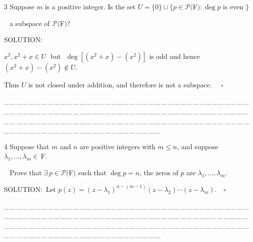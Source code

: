 \documentclass[a4paper, 11pt, UTF8]{article}
\def\Po{\mathcal{P}}
\def\Fbfc{$\,{\timesbf F}$}
\begin{document}
\begin{large}
{\timesbf\Large 3} {\timessl\Large 
Suppose $m$ is a positive integer. Is the set $U=\{0\}\cup\{p\in\Po(${\timesbf F}$):\deg p$ is even $\}$
}\par\,\,\,
{\timessl\Large a subspace of $\Po(${\timesbf F}$)$?
}\par
{\timesbf S\footnotesize{OLUTION:}}\par\quad
$x^2,x^2+x\in U$ \,\,but\,\, $\deg[(x^2+x)-(x^2)]$ is odd and hence $(x^2+x)-(x^2)\not\in U.$\par\quad
Thus $U$ is not closed under addition, and therefore is not a subspace. $\quad\square$\par
{\tiny \_\,\_\,\_\,\_\,\_\,\_\,\_\,\_\,\_\,\_\,\_\,\_\,\_\,\_\,\_\,\_\,\_\,\_\,\_\,\_\,\_\,\_\,\_\,\_\,\_\,\_\,\_\,\_\,\_\,\_\,\_\,\_\,\_\,\_\,\_\,\_\,\_\,\_\,\_\,\_\,\_\,\_\,\_\,\_\,\_\,\_\,\_\,\_\,\_\,\_\,\_\,\_\,\_\,\_\,\_\,\_\,\_\,\_\,\_\,\_\,\_\,\_\,\_\,\_\,\_\,\_\,\_\,\_\,\_\,\_\,\_\_\,\_\,\_\,\_\,\_\,\_\,\_\,\_\,\_\,\_\,\_\,\_\,\_\,\_\,\_\,\_\,\_\,\_\,\_\,\_\,\_\,\_\,\_\,\_\,\_\,\_\,\_\,\_\,\_\,\_\,\_\,\_\,\_\,\_\,\_\,\_\,\_\,\_\,\_\,\_\,\_\,\_\,\_\,\_\,\_\,\_\,\_\,\_\,\_\,\_\,\_\,\_\,\_\,\_\,\_\,\_\,\_\,\_\,\_\,\_\,\_\,\_\,\_\,\_\,\_\,\_\,\_\,\_\,\_\,\_\,\_}\par

{\timesbf\Large 4} {\timessl\Large 
Suppose that $m$ and $n$ are positive integers with $m\leq n$, and suppose $\lambda_1,\dots,\lambda_m\in\Fbfc.$
}\par\,\,\,
{\timessl\Large Prove that $\exists\,p\in\Po(${\timesbf F}$)$ such that $\deg p = n$, the zeros of $p$ are $\lambda_1,\dots,\lambda_m.$}\par
{\timesbf S\footnotesize{OLUTION:}}\,\,\,Let $p(z)=(z-\lambda_1)^{n-(m-1)}(z-\lambda_2)\cdots(z-\lambda_m).\quad\square$\par
{\tiny \_\,\_\,\_\,\_\,\_\,\_\,\_\,\_\,\_\,\_\,\_\,\_\,\_\,\_\,\_\,\_\,\_\,\_\,\_\,\_\,\_\,\_\,\_\,\_\,\_\,\_\,\_\,\_\,\_\,\_\,\_\,\_\,\_\,\_\,\_\,\_\,\_\,\_\,\_\,\_\,\_\,\_\,\_\,\_\,\_\,\_\,\_\,\_\,\_\,\_\,\_\,\_\,\_\,\_\,\_\,\_\,\_\,\_\,\_\,\_\,\_\,\_\,\_\,\_\,\_\,\_\,\_\,\_\,\_\,\_\,\_\_\,\_\,\_\,\_\,\_\,\_\,\_\,\_\,\_\,\_\,\_\,\_\,\_\,\_\,\_\,\_\,\_\,\_\,\_\,\_\,\_\,\_\,\_\,\_\,\_\,\_\,\_\,\_\,\_\,\_\,\_\,\_\,\_\,\_\,\_\,\_\,\_\,\_\,\_\,\_\,\_\,\_\,\_\,\_\,\_\,\_\,\_\,\_\,\_\,\_\,\_\,\_\,\_\,\_\,\_\,\_\,\_\,\_\,\_\,\_\,\_\,\_\,\_\,\_\,\_\,\_\,\_\,\_\,\_\,\_\,\_}\par


\end{large}
\end{document}
